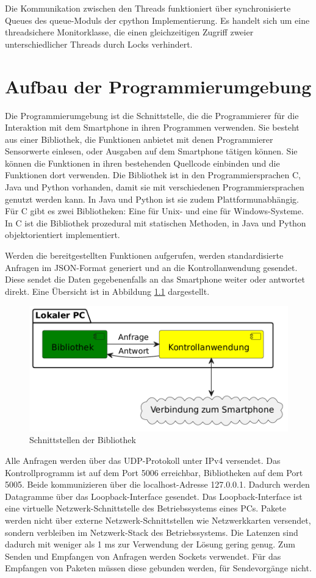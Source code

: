\documentclass[11pt,a4paper]{report}
\begin{document}
Die Kommunikation zwischen den Threads funktioniert über synchronisierte Queues des queue-Moduls\cite{python_queue} der cpython Implementierung.
Es handelt sich um eine threadsichere Monitorklasse, die einen gleichzeitigen Zugriff zweier unterschiedlicher Threads durch Locks verhindert.

\chapter{Aufbau der Programmierumgebung}\label{chap:libs}
Die Programmierumgebung ist die Schnittstelle, die die Programmierer für die Interaktion mit dem Smartphone in ihren Programmen verwenden.
Sie besteht aus einer Bibliothek, die Funktionen anbietet mit denen Programmierer Sensorwerte einlesen, oder Ausgaben auf dem Smartphone tätigen können.
Sie können die Funktionen in ihren bestehenden Quellcode einbinden und die Funktionen dort verwenden.
Die Bibliothek ist in den Programmiersprachen C, Java und Python vorhanden, damit sie mit verschiedenen Programmiersprachen genutzt werden kann.
In Java und Python ist sie zudem Plattformunabhängig.
Für C gibt es zwei Bibliotheken: Eine für Unix- und eine für Windows-Systeme.
In C ist die Bibliothek prozedural mit statischen Methoden, in Java und Python objektorientiert implementiert.

Werden die bereitgestellten Funktionen aufgerufen, werden standardisierte Anfragen im JSON-Format generiert und an die Kontrollanwendung gesendet.
Diese sendet die Daten gegebenenfalls an das Smartphone weiter oder antwortet direkt.
Eine Übersicht ist in Abbildung \ref{fig:Schnittstelle Bibliothek} dargestellt.
\begin{figure}[htbp]
  \centering
  \includegraphics[width=.8\textwidth]{images/lib_server_connection}
  \caption{Schnittstellen der Bibliothek}
  \label{fig:Schnittstelle Bibliothek}
\end{figure}

Alle Anfragen werden über das UDP-Protokoll unter IPv4 versendet.
Das Kontrollprogramm ist auf dem Port 5006 erreichbar, Bibliotheken auf dem Port 5005.
Beide kommunizieren über die localhost-Adresse 127.0.0.1.
Dadurch werden Datagramme über das Loopback-Interface gesendet.
Das Loopback-Interface ist eine virtuelle Netzwerk-Schnittstelle des Betriebssystems eines PCs.
Pakete werden nicht über externe Netzwerk-Schnittstellen wie Netzwerkkarten versendet, sondern verbleiben im Netzwerk-Stack des Betriebssystems.
Die Latenzen sind dadurch mit weniger als 1 ms zur Verwendung der Lösung gering genug.
Zum Senden und Empfangen von Anfragen werden Sockets verwendet.
Für das Empfangen von Paketen müssen diese gebunden werden, für Sendevorgänge nicht.
\end{document}
